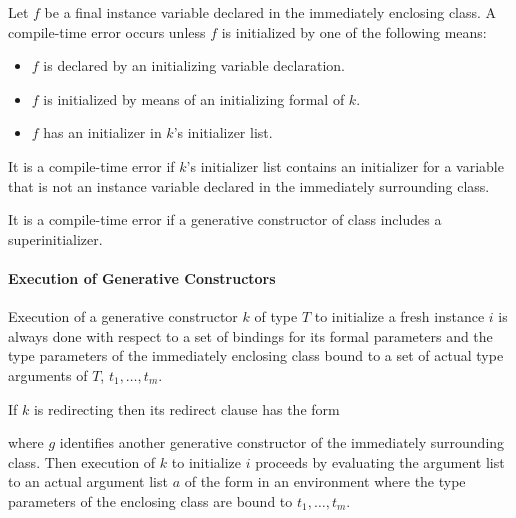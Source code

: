 \documentclass[makeidx]{article}
\begin{document}
\LMHash{}%
Let $f$ be a final instance variable declared in
the immediately enclosing class.
A compile-time error occurs unless $f$ is initialized
by one of the following means:
\begin{itemize}
\item $f$ is declared by an initializing variable declaration.
\item $f$ is initialized by means of an initializing formal of $k$.
\item $f$ has an initializer in $k$'s initializer list.
\end{itemize}

\LMHash{}%
It is a compile-time error if $k$'s initializer list contains an initializer for a variable that is not an instance variable declared in the immediately surrounding class.


\LMHash{}%
It is a compile-time error if a generative constructor of class  includes a superinitializer.


\paragraph{Execution of Generative Constructors}

\LMHash{}%
Execution of a generative constructor $k$ of type $T$ to initialize a fresh instance $i$
is always done with respect to a set of bindings for its formal parameters
and the type parameters of the immediately enclosing class bound to
a set of actual type arguments of $T$, $t_1, \ldots, t_m$.


\LMHash{}%
If $k$ is redirecting then its redirect clause has the form


where $g$ identifies another  generative constructor of the immediately surrounding class.
Then execution of $k$ to initialize $i$ proceeds by evaluating the argument list
to an actual argument list $a$ of the form
in an environment where the type parameters of the enclosing class are bound to
$t_1, \ldots, t_m$.
\end{document}

